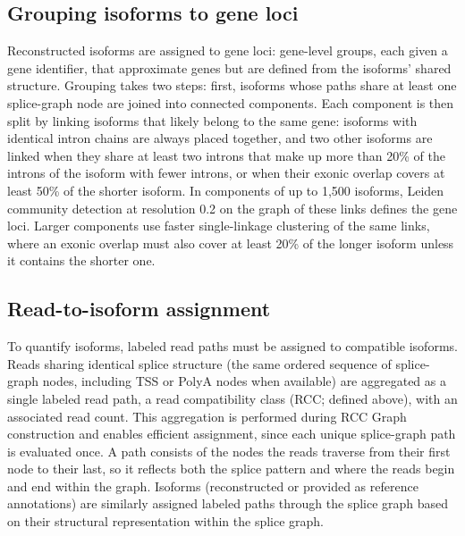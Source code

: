 \subsection{Grouping isoforms to gene loci}\label{grouping-isoforms-to-gene-loci}

Reconstructed isoforms are assigned to gene loci: gene-level groups, each given a gene identifier, that approximate genes but are defined from the isoforms' shared structure. Grouping takes two steps: first, isoforms whose paths share at least one splice-graph node are joined into connected components. Each component is then split by linking isoforms that likely belong to the same gene: isoforms with identical intron chains are always placed together, and two other isoforms are linked when they share at least two introns that make up more than 20\% of the introns of the isoform with fewer introns, or when their exonic overlap covers at least 50\% of the shorter isoform. In components of up to 1,500 isoforms, Leiden community detection at resolution 0.2 \citep{traag2019} on the graph of these links defines the gene loci. Larger components use faster single-linkage clustering of the same links, where an exonic overlap must also cover at least 20\% of the longer isoform unless it contains the shorter one.

\subsection{Read-to-isoform assignment}\label{read-to-isoform-assignment}

To quantify isoforms, labeled read paths must be assigned to compatible isoforms. Reads sharing identical splice structure (the same ordered sequence of splice-graph nodes, including TSS or PolyA nodes when available) are aggregated as a single labeled read path, a read compatibility class (RCC; defined above), with an associated read count. This aggregation is performed during RCC Graph construction and enables efficient assignment, since each unique splice-graph path is evaluated once. A path consists of the nodes the reads traverse from their first node to their last, so it reflects both the splice pattern and where the reads begin and end within the graph. Isoforms (reconstructed or provided as reference annotations) are similarly assigned labeled paths through the splice graph based on their structural representation within the splice graph.

